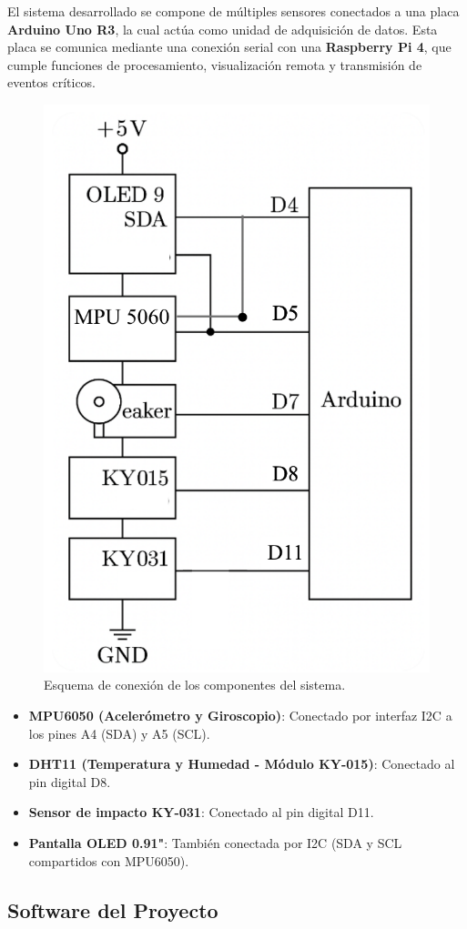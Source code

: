 \documentclass[conference]{IEEEtran}
\begin{document}
El sistema desarrollado se compone de múltiples sensores conectados a una placa \textbf{Arduino Uno R3}, la cual actúa como unidad de adquisición de datos. Esta placa se comunica mediante una conexión serial con una \textbf{Raspberry Pi 4}, que cumple funciones de procesamiento, visualización remota y transmisión de eventos críticos.



\begin{figure}[H]
  \centering
  \includegraphics[width=0.55\linewidth]{figs/Esquema.png}
  \caption{Esquema de conexión de los componentes del sistema.}
  \label{fig:esquema_conexion}
\end{figure}


\begin{itemize}
  \item \textbf{MPU6050 (Acelerómetro y Giroscopio)}: Conectado por interfaz I2C a los pines A4 (SDA) y A5 (SCL).
  \item \textbf{DHT11 (Temperatura y Humedad - Módulo KY-015)}: Conectado al pin digital D8.
  \item \textbf{Sensor de impacto KY-031}: Conectado al pin digital D11.
  \item \textbf{Pantalla OLED 0.91"}: También conectada por I2C (SDA y SCL compartidos con MPU6050).
\end{itemize}


\subsection{Software del Proyecto}
\end{document}
